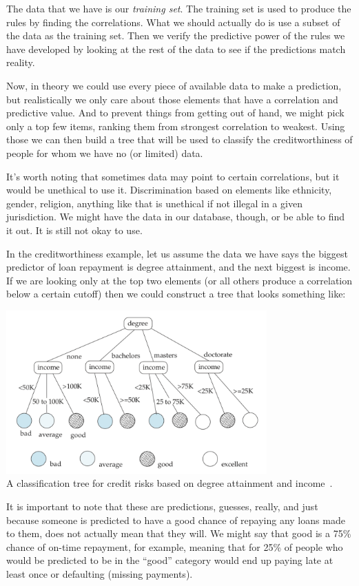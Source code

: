 The data that we have is our \textit{training set}. The training set is used to produce the rules by finding the correlations. What we should actually do is use a subset of the data as the training set. Then we verify the predictive power of the rules we have developed by looking at the rest of the data to see if the predictions match reality.

Now, in theory we could use every piece of available data to make a prediction, but realistically we only care about those elements that have a correlation and predictive value. And to prevent things from getting out of hand, we might pick only a top few items, ranking them from strongest correlation to weakest. Using those we can then build a tree that will be used to classify the creditworthiness of people for whom we have no (or limited) data.

It's worth noting that sometimes data may point to certain correlations, but it would be unethical to use it. Discrimination based on elements like ethnicity, gender, religion, anything like that is unethical if not illegal in a given jurisdiction. We might have the data in our database, though, or be able to find it out. It is still not okay to use.

In the creditworthiness example, let us assume the data we have says the biggest predictor of loan repayment is degree attainment, and the next biggest is income. If we are looking only at the top two elements (or all others produce a correlation below a certain cutoff) then we could construct a tree that looks something like:
\begin{center}
\includegraphics[width=0.75\textwidth]{images/classification-tree}\\
A classification tree for credit risks based on degree attainment and income~\cite{dsc}.
\end{center}

It is important to note that these are predictions, guesses, really, and just because someone is predicted to have a good chance of repaying any loans made to them, does not actually mean that they will. We might say that good is a 75\% chance of on-time repayment, for example, meaning that for 25\% of people who would be predicted to be in the ``good'' category would end up paying late at least once or defaulting (missing payments). 

